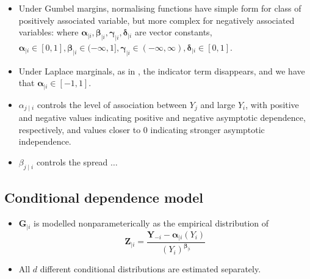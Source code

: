 \documentclass{article}
\begin{document}
\begin{itemize}
  \item Under Gumbel margins, normalising functions have simple form for class of positively associated variable, but more complex for negatively associated variables:
    where $\bm{\alpha}_{\mid i}, \bm{\beta}_{\mid i}, \bm{\gamma}_{\mid i}, \bm{\delta}_{\mid i}$ are vector constants, $\bm{\alpha}_{\mid i} \in [0, 1], \bm{\beta}_{\mid i} \in (-\infty, 1], \bm{\gamma}_{\mid i} \in (-\infty, \infty) , \bm{\delta}_{\mid i} \in [0, 1]$. 
  \item Under Laplace marginals, as in \cite{Keef2013}, the indicator term disappears, and we have that $\bm{\alpha}_{\mid i} \in [-1, 1]$. 
  \item $\alpha_{j \mid i}$ controls the level of association between $Y_j$ and large $Y_i$, with positive and negative values indicating positive and negative asymptotic dependence, respectively, and values closer to 0 indicating stronger asymptotic independence. 
  \item $\beta_{j \mid i}$ controls the spread $\ldots$ 
\end{itemize}


\subsection{Conditional dependence model}

\begin{itemize}
  \item $\bm{G}_{\mid i}$ is modelled nonparameterically as the empirical distribution of 
    \[ 
      \bm{Z}_{\mid i} = \frac{\bm{Y}_{-i} - \bm{\alpha}_{\mid i}(Y_i)}{(Y_i)^{\bm{\beta}_{\mid i}}}
    \]
  \item All $d$ different conditional distributions are estimated separately.
\end{itemize}
\end{document}
